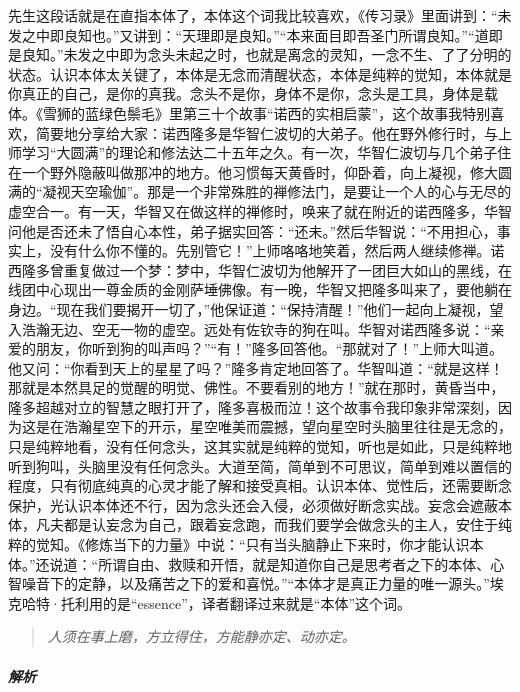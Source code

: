 先生这段话就是在直指本体了，本体这个词我比较喜欢，《传习录》里面讲到：“未发之中即良知也。”又讲到：“天理即是良知。”“本来面目即吾圣门所谓良知。”“道即是良知。”未发之中即为念头未起之时，也就是离念的灵知，一念不生、了了分明的状态。认识本体太关键了，本体是无念而清醒状态，本体是纯粹的觉知，本体就是你真正的自己，是你的真我。念头不是你，身体不是你，念头是工具，身体是载体。《雪狮的蓝绿色鬃毛》里第三十个故事“诺西的实相启蒙”，这个故事我特别喜欢，简要地分享给大家：诺西隆多是华智仁波切的大弟子。他在野外修行时，与上师学习“大圆满”的理论和修法达二十五年之久。有一次，华智仁波切与几个弟子住在一个野外隐蔽叫做那冲的地方。他习惯每天黄昏时，仰卧着，向上凝视，修大圆满的“凝视天空瑜伽”。那是一个非常殊胜的禅修法门，是要让一个人的心与无尽的虚空合一。有一天，华智又在做这样的禅修时，唤来了就在附近的诺西隆多，华智问他是否还未了悟自心本性，弟子据实回答：“还未。”然后华智说：“不用担心，事实上，没有什么你不懂的。先别管它！”上师咯咯地笑着，然后两人继续修禅。诺西隆多曾重复做过一个梦：梦中，华智仁波切为他解开了一团巨大如山的黑线，在线团中心现出一尊金质的金刚萨埵佛像。有一晚，华智又把隆多叫来了，要他躺在身边。“现在我们要揭开一切了，”他保证道：“保持清醒！”他们一起向上凝视，望入浩瀚无边、空无一物的虚空。远处有佐钦寺的狗在叫。华智对诺西隆多说：“亲爱的朋友，你听到狗的叫声吗？”“有！”隆多回答他。“那就对了！”上师大叫道。他又问：“你看到天上的星星了吗？”隆多肯定地回答了。华智叫道：“就是这样！那就是本然具足的觉醒的明觉、佛性。不要看别的地方！”就在那时，黄昏当中，隆多超越对立的智慧之眼打开了，隆多喜极而泣！这个故事令我印象非常深刻，因为这是在浩瀚星空下的开示，星空唯美而震撼，望向星空时头脑里往往是无念的，只是纯粹地看，没有任何念头，这其实就是纯粹的觉知，听也是如此，只是纯粹地听到狗叫，头脑里没有任何念头。大道至简，简单到不可思议，简单到难以置信的程度，只有彻底纯真的心灵才能了解和接受真相。认识本体、觉性后，还需要断念保护，光认识本体还不行，因为念头还会入侵，必须做好断念实战。妄念会遮蔽本体，凡夫都是认妄念为自己，跟着妄念跑，而我们要学会做念头的主人，安住于纯粹的觉知。《修炼当下的力量》中说：“只有当头脑静止下来时，你才能认识本体。”还说道：“所谓自由、救赎和开悟，就是知道你自己是思考者之下的本体、心智噪音下的定静，以及痛苦之下的爱和喜悦。”“本体才是真正力量的唯一源头。”埃克哈特·托利用的是“essence”，译者翻译过来就是“本体”这个词。

\begin{quote}\it
    人须在事上磨，方立得住，方能静亦定、动亦定。
\end{quote}

\subparagraph{解析}

